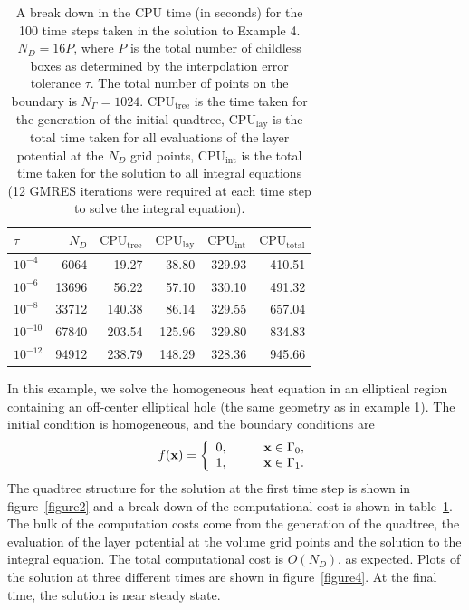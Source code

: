 \documentclass[preprint,12pt]{elsarticle}
\newcommand{\x}{{\bf x}}
\newcommand{\figr}[1]{figure~\ref{#1}}
\newcommand{\tabr}[1]{table~\ref{#1}}
\begin{document}
\begin{table}[h]
  \centering
\begin{tabular*}{\textwidth}{@{\extracolsep{\fill}}lrrrrr}
    \hline
    $\tau$ & $N_D$ & $\mbox{CPU}_{\mbox{tree}}$ & $\mbox{CPU}_{\mbox{lay}}$ & $\mbox{CPU}_{\mbox{int}}$ 
    & $\mbox{CPU}_{\mbox{total}}$ \vspace{0.05in} \\ 
    \hline
    $10^{-4}$   & 6064   & 19.27 & 38.80   & 329.93 & 410.51   \\
    $10^{-6}$   & 13696 & 56.22 & 57.10   & 330.10 & 491.32   \\
    $10^{-8}$   & 33712 & 140.38 & 86.14   & 329.55 & 657.04 \\
    $10^{-10}$ & 67840 & 203.54 & 125.96 & 329.80 & 834.83 \\
    $10^{-12}$ & 94912 & 238.79 & 148.29 & 328.36 & 945.66 \\

    \hline
  \end{tabular*}
\caption{A break down in the CPU time (in seconds) for the 100 time steps taken in the solution to Example 4. $N_D = 16 P$, where $P$ is the total number of childless boxes as determined by the interpolation error tolerance $\tau$. The total number of points on the boundary is $N_{\Gamma} = 1024$. $\mbox{CPU}_{\mbox{tree}}$ is the time taken for the generation of the initial quadtree, $\mbox{CPU}_{\mbox{lay}}$ is the total time taken for all evaluations of the layer potential at the $N_D$ grid points, $\mbox{CPU}_{\mbox{int}}$ is the total time taken for the solution to all integral equations (12 GMRES iterations were required at each time step to solve the integral equation).
\label{table4} }
\end{table}
 In this example, we solve the homogeneous heat equation in an elliptical region containing an off-center elliptical hole (the same geometry as in example 1).  The initial condition is homogeneous, and the boundary conditions are
\[
   f(\x) = \left\{ \begin{array}{rl}
                            0, & \qquad \x \in \Gamma_0, \\
                            1, & \qquad \x \in \Gamma_1.
                         \end{array} \right.
\]
The quadtree structure for the solution at the first time step is shown in \figr{figure2} and a break down of the computational cost is shown in \tabr{table4}. The bulk of the computation costs come from the generation of the quadtree, the evaluation of the layer potential at the volume grid points and the solution to the integral equation. The total computational cost is $O(N_D)$, as expected. Plots of the solution at three different times are shown in \figr{figure4}. At the final time, the solution is near steady state. 
\end{document}
